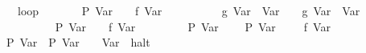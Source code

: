 \begin{isabellebody}
\ \ \ \ {}\ loop\isanewline
\ \ \ \ \ \ {}\ {}{}P\ {}Var\ {}{}{}{}\ {}\ {}{}\ f\ {}Var\ {}{}\isanewline
\ \ \ \ \ \ {}\ {}\ {}{}\ g\ {}Var\ {}{}\ {}Var\ {}{}{}\ {}\ {}{}\ g\ {}Var\ {}{}\ {}Var\ {}{}\isanewline
\ \ \ \ \ \ {}\isanewline
\ \ \ \ {}\ P\ {}Var\ {}{}{}\ {}\ {}{}\ f\ {}Var\ {}{}\isanewline
\ \ \ \ {}\isanewline
\ \ {}\ P\ {}Var\ {}{}\isanewline
\ \ {}\ {}{}{}P\ {}Var\ {}{}{}\ {}\ {}\ {}{}\ f\ {}Var\ {}{}{}\isanewline
\ \ {}\ P\ {}Var\ {}{}{}\ P\ {}Var\ {}{}{}\ {}\ {}{}\ Var\ {}{}\ halt\isanewline

\end{isabellebody}
